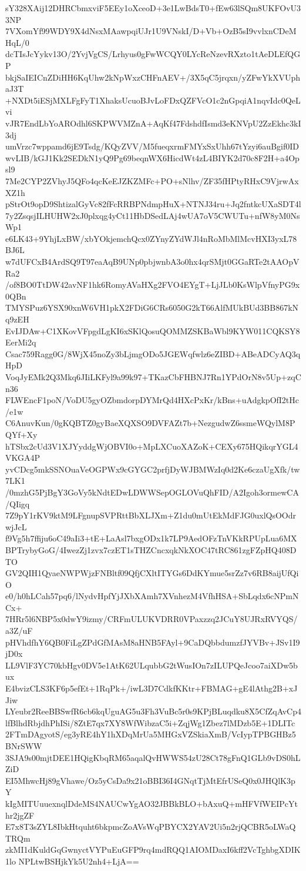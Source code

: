 sY328XAij12DHRCbmxviF5EEy1oXceoD+3e1LwBdsT0+fEw63lSQm8UKFOvU33NP
7VXomYf99WDY9X4dNsxMAawpqiUJr1U9VNskI/D+Vb+OzB5sI9vvlxnCDeMHqL/0
dcTIsJcYykv13O/2YvjVgCS/Lrhyus0gFwWCQY0LYcReNzevRXzto1tAeDLEfQGP
bkjSaIEICnZDiHH6KqUhw2kNpWxzCHFnAEV+/3X5qC5jrqxn/yZFwYkXVUphaJ3T
+NXDt5iESjMXLFgFyT1XhaksUcuoBJvLoFDxQZFVcO1c2nGpqiA1nqvIdc0QeLvi
vJR7EndLbYoAROdhl6SKPWVMZnA+AqKf47FdshdfIsmd3eKNVpU2ZzEkhc3kI3dj
umVrzc7wppamd6jE9Tsdg/KQyZVV/M5fueqxrmFMYxSxUhh67tYzyi6auBgif0ID
wvLIB/kGJ1Kk2SEDkN1yQ9Pg69beqnWX6HicdWt4zL4BIYK2d70c8F2H+a4Opsl9
7Me2CYP2ZVhyJ5QFo4qcKeEJZKZMFc+PO+sNlhv/ZF35fHPtyRHxC9VjrwAxXZ1h
pStrOt9opD9ShtizalGyVc82fFcRRBPNdmpHuX+NTNJ34ru+Jq2fntkcUXaSDT4l
7y2ZsqsjILHUHW2xJ0plxqg4yCt11HbDSedLAj4wUA7oV5CWUTu+nfW8yM0NsWp1
e6LK43+9YhjLxBW/xbYOkjemchQcx0ZYnyZYdWJl4nRoMbMlMcvHXI3yxL78BJ6L
w7dUFCxB4ArdSQ9T97eaAqB9UNp0pbjwnbA3o0hx4qrSMjt0GGaRTe2tAAOpVRa2
/of8BO0TtDW42avNF1hk6RomyAVaHXg2FVO4EYgT+LjJLb0KsWlpVfnyPG9x0QBn
TMYSPuz6YSX90xnW6VH1pkX2FDiG6CRs6050G2kT66AlfMUkBUd3BB867kNq9zEH
EvIJDAw+C1XKovVFpgdLgKI6xSKlQosuQOMMZSKBaWbl9KYW011CQKSY8EerMi2q
Csac759Ragg0G/8WjX45noZy3bLjmgODo5JGEWqfwlz6eZIBD+ABeADCyAQ3qHpD
VoqJyEMk2Q3Mkq6JIiLKFyl9a99k97+TKazCbFHBNJ7Rn1YPdOrN8v5Up+zqCn36
FLWEncF1poN/VoDU5gyOZbmdorpDYMrQd4HXcPxKr/kBns+uAdgkpOfI2tHc/e1w
C6AnuvKun/0gKQBTZ0gyBaeXQXSO9DVFAZt7b+NezgudwZ6ssmeWQylM8PQYf+Xy
hTSbx2cUd3V1XJYyddgWjOBVI0o+MpLXCuoXAZoK+CEXy675HQikqrYGL4VKGA4P
yvCDcg5mkSSNOuaVeOGPWx9cGYGC2prfjDyWJBMWzIq0d2Ke6czaUgXfk/tw7LK1
/0mzhG5PjBgY3GoVy5kNdtEDwLDWWSepOGLOVuQhFID/A2Igoh3ormewCA/QIigq
7Z9pY1rKV9ktM9LFgnupSVPRttBbXLJXm+Z1du0mUtEkMdFJG0uxlQsOOdrwjJcL
f9Vg5h7ffiju6oC49aIi3+tE+LaAsl7bxgODx1k7LP9AedOFzTnVKkRPUpLua6MX
BPTrybyGoG/4IwezZj1zvx7czET1sTHZCncxqkNkXOC47tRC861zgFZpHQ408DTO
GV2QIH1QyaeNWPWjzFNBltf09QfjCXltITYGs6DdKYmue5srZz7v6RB8aijUfQiO
e0/h0hLCah57pq6/lNydvHpfYjJXbXAmh7XVnhezM4VfhHSA+SbLqdx6cNPmNCx+
7HRr5l6NBP5x0dwY9izmy/CRFmULUKVDRR0VPaxzzq2JCuY8UJRxRVYQS/a3Z/uF
pHVhdfhY6QB0FiLgZPdGfMAsM8aHNB5FAyl+9CaDQbbdumzfJYVBv+JSv1I9jD0x
LL9VlF3YC70kbHgv0DV5e1AtK62ULqubbG2tWusIOn7zILUPQeJcoo7aiXDw5bux
E4bvizCLS3KF6p5efEt+1RqPk+/iwL3D7CdkfKKtr+FBMAG+gE4lAthg2B+xJJiw
LYeubr2ReeBBSwfR6cb6kqUguAG5u3Fh3VuBc5r0s9KPjBLuqdku8X5CfZqAvCp4
lfBlhdRbjdhPhISi/8ZtE7qx7XY8WfWibzaC5i+ZqjWg1Zbez7lMDzb5E+1DLITc
2FTmDAgyotS/eg3yRE4hY1hXDqMrUa5MHGxVZSkiaXmB/VcIypTPBGHBz5BNrSWW
3SJA9s00mjtDEE1HQigKbqRM65aqalQvHWWS54zU28Ct78gFnQ1GLb9vDS0hLZiD
EI5MhwcHj89gVhawe/Oz5yCsDa9x21oBBI36I4GNqtTjMtEfrUSeQ0x0JHQlK3pY
kIgMITUuuexnqlDdeMS4NAUCwYgAO32JBBkBLO+bAxuQ+mHFVfWEIPcYthr2jgZF
E7x8T3sZYL8IbkHtquht6bkpmcZoAVsWqPBYCX2YAV2Ui5n2rjQCBR5oLWaQTRQm
zkMI1dKuldGqGwnyctVYPuEuGFP9rq4mdRQQ1AIOMDaxI6kff2VcTghbgXDIK1lo
NPLtwBSHjkYk5U2nh4+LjA==
